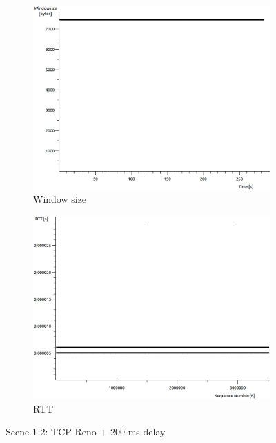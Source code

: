 \documentclass[conference,a4paper]{IEEEtran}
\begin{document}
\begin{figure}
\begin{subfigure}[b]{0.2\textwidth}
  \includegraphics[width=\textwidth]{s1-2_wnd}
  \caption{Window size}
 \end{subfigure}
 \begin{subfigure}[b]{0.2\textwidth}
  \includegraphics[width=\textwidth]{s1-2_rtt}
  \caption{RTT}
 \end{subfigure}
 \caption{Scene 1-2: TCP Reno + 200 ms delay}
\end{figure}
\end{document}
